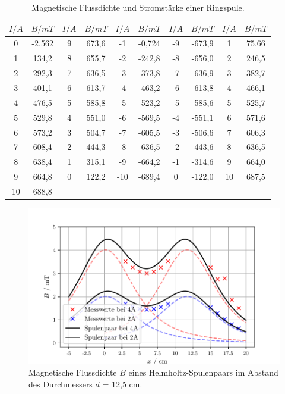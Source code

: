 \begin{table}[H]
  \centering
  \caption{Magnetische Flussdichte und Stromstärke einer Ringspule.}
  \begin{tabular}{c c | c c | c c | c c | c c}
    \toprule
     $I/A$ & $B/mT$ &$I/A$ & $B/mT$ & $I/A$ & $B/mT$ &$I/A$ & $B/mT$ & $I/A$ & $B/mT$  \\
    \midrule
    0 &-2,562 & 9 & 673,6 & -1 & -0,724 & -9 & -673,9 & 1 & 75,66\\
    1 & 134,2 & 8 & 655,7 & -2 & -242,8 & -8 & -656,0 & 2 & 246,5\\
    2 & 292,3 & 7 & 636,5 & -3 & -373,8 & -7 & -636,9 & 3 & 382,7\\
    3 & 401,1 & 6 & 613,7 & -4 & -463,2 & -6 & -613,8 & 4 & 466,1\\
    4 & 476,5 & 5 & 585,8 & -5 & -523,2 & -5 & -585,6 & 5 & 525,7\\
    5 & 529,8 & 4 & 551,0 & -6 & -569,5 & -4 & -551,1 & 6 & 571,6\\
    6 & 573,2 & 3 & 504,7 & -7 & -605,5 & -3 & -506,6 & 7 & 606,3\\
    7 & 608,4 & 2 & 444,3 & -8 & -636,5 & -2 & -443,6 & 8 & 636,5\\
    8 & 638,4 & 1 & 315,1 & -9 & -664,2 & -1 & -314,6 & 9 & 664,0\\
    9 & 664,8 & 0 & 122,2 & -10 & -689,4 & 0 & -122,0 & 10 & 687,5\\
    10 & 688,8 \\
   
    
  \bottomrule
  \end{tabular}
\end{table}


\begin{figure}
  \centering
  \includegraphics{helmholtzD.pdf}
  \caption{Magnetische Flussdichte $B$ eines Helmholtz-Spulenpaars im Abstand des Durchmessers $d$ = 12,5 cm.}
  \label{fig:plot}
\end{figure}

